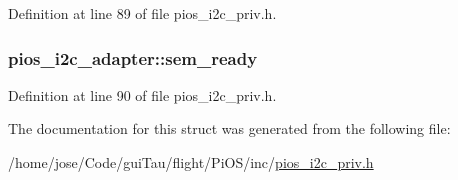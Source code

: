 Definition at line 89 of file pios\-\_\-i2c\-\_\-priv.\-h.

\hypertarget{structpios__i2c__adapter_a8a95bc22396c17869efa5a587a1bd5dc}{
\subsubsection[{sem\-\_\-ready}]{ pios\-\_\-i2c\-\_\-adapter\-::sem\-\_\-ready}}\label{structpios__i2c__adapter_a8a95bc22396c17869efa5a587a1bd5dc}


Definition at line 90 of file pios\-\_\-i2c\-\_\-priv.\-h.



The documentation for this struct was generated from the following file\-:\begin{DoxyCompactItemize}
\item 
/home/jose/\-Code/gui\-Tau/flight/\-Pi\-O\-S/inc/\hyperlink{pios__i2c__priv_8h}{pios\-\_\-i2c\-\_\-priv.\-h}\end{DoxyCompactItemize}
